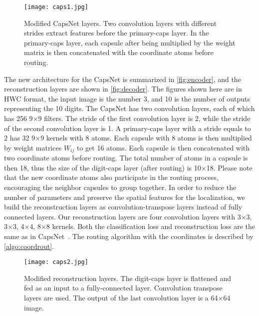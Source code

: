\documentclass{article}
\begin{document}
\begin{figure}
\centering
\texttt{[image: caps1.jpg]}
\caption{\label{fig:encoder} Modified CapsNet layers. Two convolution layers with different strides extract features before the primary-caps layer. In the primary-caps layer, each capsule after being multiplied by the weight matrix is then concatenated with the coordinate atoms before routing.}
\end{figure}

The new architecture for the CapsNet is summarized in \autoref{fig:encoder}, and the reconstruction layers are shown in \autoref{fig:decoder}. The figures shown here are in HWC format, the input image is the number 3, and 10 is the number of outputs representing the 10 digits. The CapsNet has two convolution layers, each of which has 256 9$\times$9 filters. The stride of the first convolution layer is 2, while the stride of the second convolution layer is 1. A primary-caps layer with a stride equals to 2 has 32 9$\times$9 kernels with 8 atoms. Each capsule with 8 atoms is then multiplied by weight matrices $W_{ij}$ to get 16 atoms. Each capsule is then concatenated with two coordinate atoms before routing. The total number of atoms in a capsule is then 18, thus the size of the digit-caps layer (after routing) is 10$\times$18. Please note that the new coordinate atoms also participate in the routing process, encouraging the neighbor capsules to group together. In order to reduce the number of parameters and preserve the spatial features for the localization, we build the reconstruction layers as convolution-transpose layers instead of fully connected layers. Our reconstruction layers are four convolution layers with 3$\times$3, 3$\times$3, 4$\times$4, 8$\times$8 kernels. Both the classification loss and reconstruction loss are the same as in CapsNet~\cite{sabour2017dynamic}. The routing algorithm with the coordinates is described by \autoref{algo:coordrout}.

\begin{figure}
\centering
\texttt{[image: caps2.jpg]}
\caption{\label{fig:decoder} Modified reconstruction layers. The digit-caps layer is flattened and fed as an input to a fully-connected layer. Convolution transpose layers are used. The output of the last convolution layer is a 64$\times$64 image.}
\end{figure}
\end{document}
